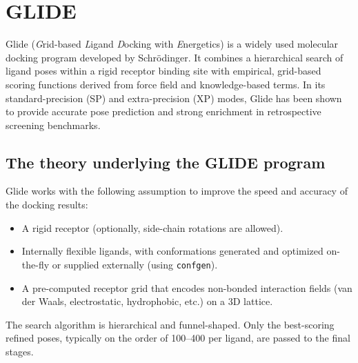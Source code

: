 \documentclass[12pt]{article}
\begin{document}
\section{GLIDE}

Glide (\emph{G}rid-based \emph{L}igand \emph{D}ocking with \emph{E}nergetics) is a widely used molecular docking program developed by Schr\"{o}dinger\cite{CH7_Friesner2004a,CH7_Friesner2004b}. It combines a hierarchical search of ligand poses within a rigid receptor binding site with empirical, grid-based scoring functions derived from force field and knowledge-based terms. In its standard-precision (SP) and extra-precision (XP) modes, Glide has been shown to provide accurate pose prediction and strong enrichment in retrospective screening benchmarks\cite{CH7_Friesner2004a,CH7_Friesner2006,CH7_Friesner2004b}.


\subsection{The theory underlying the GLIDE program}
Glide works with the following assumption to improve the speed and accuracy of the docking results:
\begin{itemize}
  \item A rigid receptor (optionally, side-chain rotations are allowed).
  \item Internally flexible ligands, with conformations generated and optimized on-the-fly or supplied externally (using \verb|confgen|\cite{CH7_confgen}).
  \item A pre-computed receptor grid that encodes non-bonded interaction fields (van der Waals, electrostatic, hydrophobic, etc.) on a 3D lattice.
\end{itemize}

The search algorithm is hierarchical and funnel-shaped\cite{CH7_Friesner2004a}. Only the best-scoring refined poses, typically on the order of 100–400 per ligand, are passed to the final stages.
\end{document}
